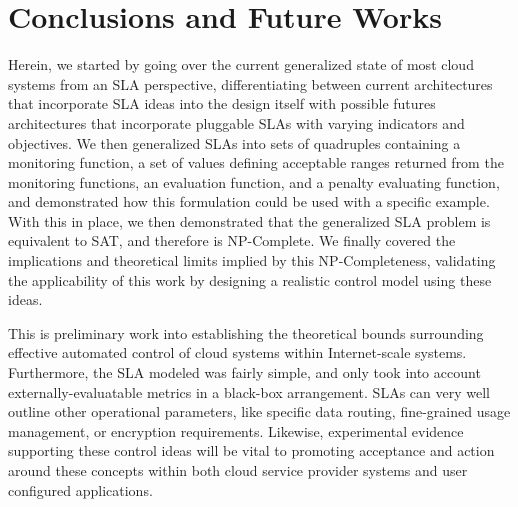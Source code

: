 \section{Conclusions and Future Works}
\noindent Herein, we started by going over the current generalized state of most cloud systems from an SLA perspective, differentiating between current architectures that incorporate SLA ideas into the design itself with possible futures architectures that incorporate pluggable SLAs with varying indicators and objectives.  We then generalized SLAs into sets of quadruples containing a monitoring function, a set of values defining acceptable ranges returned from the monitoring functions, an evaluation function, and a penalty evaluating function, and demonstrated how this formulation could be used with a specific example.  With this in place, we then demonstrated that the generalized SLA problem is equivalent to SAT, and therefore is NP-Complete.  We finally covered the implications and theoretical limits implied by this NP-Completeness, validating the applicability of this work by designing a realistic control model using these ideas.

This is preliminary work into establishing the theoretical bounds surrounding effective automated control of cloud systems within Internet-scale systems.  Furthermore, the SLA modeled was fairly simple, and only took into account externally-evaluatable metrics in a black-box arrangement.  SLAs can very well outline other operational parameters, like specific data routing, fine-grained usage management, or encryption requirements.  Likewise, experimental evidence supporting these control ideas will be vital to promoting acceptance and action around these concepts within both cloud service provider systems and user configured applications.